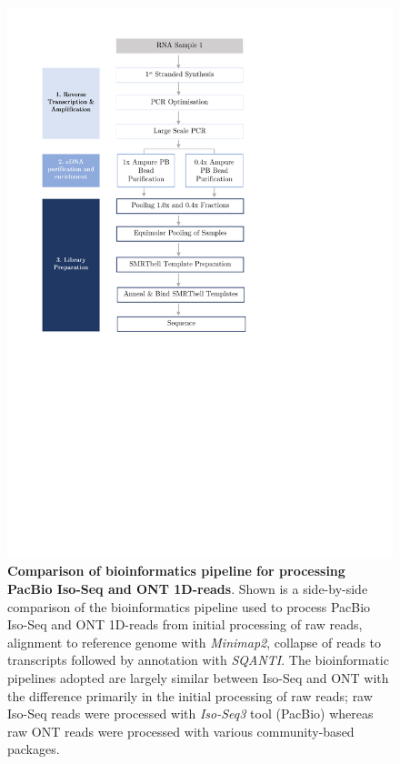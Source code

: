 \begin{figure}[htp]
	\centering
	\includegraphics[page=15,trim={0cm 6cm 0cm 0cm},clip,scale = 0.8]{Figures/ProjectDevelopment_Figures}
	\captionsetup{width=0.95\textwidth,singlelinecheck=off}
	\caption[Comparison of bioinformatics pipeline for processing PacBio Iso-Seq and ONT 1D-reads]%
	{\textbf{Comparison of bioinformatics pipeline for processing PacBio Iso-Seq and ONT 1D-reads}. Shown is a side-by-side comparison of the bioinformatics pipeline used to process PacBio Iso-Seq and ONT 1D-reads from initial processing of raw reads, alignment to reference genome with \textit{Minimap2}, collapse of reads to transcripts followed by annotation with \textit{SQANTI}. The bioinformatic pipelines adopted are largely similar between Iso-Seq and ONT with the difference primarily in the initial processing of raw reads; raw Iso-Seq reads were processed with \textit{Iso-Seq3} tool (PacBio) whereas raw ONT reads were processed with various community-based packages.   
	}
	\label{fig:ONT_PacBio_bioinformatics}
\end{figure}

